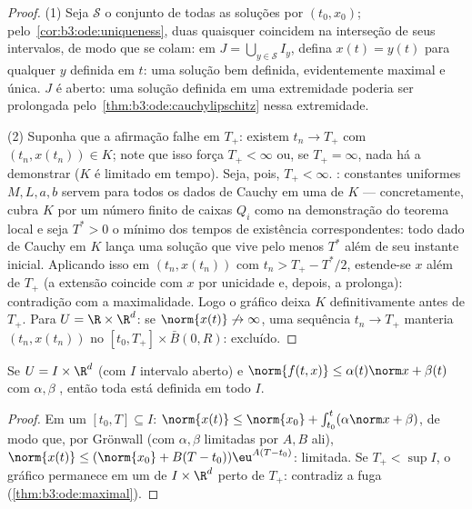 \begin{proof}
(1) Seja $\mathcal S$ o conjunto de todas as soluções por $(t_0, x_0)$;
pelo~\cref{cor:b3:ode:uniqueness}, duas quaisquer coincidem na interseção de seus
intervalos, de modo que se colam: em $J =
\bigcup_{y \in \mathcal S}I_y$, defina $x(t) = y(t)$ para qualquer
$y$ definida em $t$: uma solução bem definida, evidentemente
maximal e única. $J$ é aberto: uma solução definida em uma
extremidade poderia ser prolongada pelo~\cref{thm:b3:ode:cauchylipschitz} nessa
extremidade.

(2) Suponha que a afirmação falhe em $T_+$: existem $t_n \to
T_+$ com $(t_n, x(t_n)) \in K$;
note que isso força $T_+ <
\infty$ ou, se $T_+ = \infty$, nada há a demonstrar ($K$ é
limitado em tempo). Seja, pois, $T_+ < \infty$. : constantes uniformes
$M, L, a,
b$ servem para todos os dados de Cauchy em uma  de $K$
--- concretamente, cubra $K$ por um número finito de caixas
$Q_i$ como na demonstração do teorema local e seja $T^* > 0$ o mínimo dos
tempos de existência correspondentes: todo dado de Cauchy em $K$
lança uma solução que vive pelo menos $T^*$ além de seu instante
inicial. Aplicando isso em $(t_n, x(t_n))$ com $t_n > T_+ -
T^*/2$, estende-se $x$ além de
$T_+$ (a extensão coincide com $x$ por unicidade e, depois, a
prolonga): contradição com a maximalidade. Logo o gráfico deixa
$K$ definitivamente antes de $T_+$. Para $U = \R\times\R^d$: se $\norm{x(t)}\not\to\infty$, uma
sequência $t_n \to T_+$ manteria $(t_n, x(t_n))$ no  $[t_0, T_+]\times\bar B(0, R)$: excluído.
\end{proof}

\begin{corollary}
\label{cor:b3:ode:globallinear}
Se $U = I\times\R^d$ (com $I$ intervalo aberto) e $\norm{f(t, x)}
\leq \alpha(t)\norm x + \beta(t)$ com $\alpha, \beta$ ,
então toda  está definida em todo $I$.
\end{corollary}

\begin{proof}
Em um  $[t_0, T] \subseteq I$: $\norm{x(t)} \leq
\norm{x_0} + \int_{t_0}^t(\alpha\norm x + \beta)$, de modo que, por Grönwall (com $\alpha, \beta$
limitadas por $A, B$ ali), $\norm{x(t)} \leq (\norm{x_0} + B(T - t_0))\eu^{A(T - t_0)}$: limitada. Se $T_+ < \sup I$, o gráfico
permanece em um  de $I\times\R^d$ perto de $T_+$: contradiz a fuga
(\cref{thm:b3:ode:maximal}).
\end{proof}

